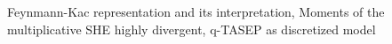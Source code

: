 Feynmann-Kac representation and its interpretation, Moments of the multiplicative SHE highly divergent, q-TASEP as discretized model